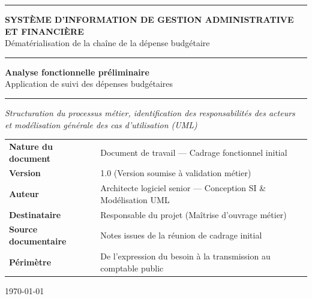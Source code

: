 \begin{titlepage}
\thispagestyle{empty}

\begin{center}
  {\color{BleuInstitutionnel}\rule{\linewidth}{2pt}}
  \vspace{0.3cm}

  {\large\sffamily\bfseries\textcolor{BleuInstitutionnel}{SYSTÈME D'INFORMATION DE GESTION ADMINISTRATIVE ET FINANCIÈRE}}\\[0.2cm]
  {\normalsize\sffamily\textcolor{GrisFonce}{Dématérialisation de la chaîne de la dépense budgétaire}}

  \vspace{0.3cm}
  {\color{BleuInstitutionnel}\rule{\linewidth}{0.8pt}}

  \vspace{3.2cm}

  {\fontsize{22}{28}\selectfont\sffamily\bfseries\textcolor{BleuInstitutionnel}{Analyse fonctionnelle préliminaire}}\\[0.5cm]
  {\fontsize{16}{22}\selectfont\sffamily\textcolor{BleuSecondaire}{Application de suivi des dépenses budgétaires}}

  \vspace{1.2cm}
  {\color{GrisBordure}\rule{0.45\linewidth}{1pt}}
  \vspace{1.2cm}

  {\normalsize\itshape\textcolor{GrisFonce}{%
    Structuration du processus métier, identification des responsabilités des acteurs\\
    et modélisation générale des cas d'utilisation (UML)%
  }}

  \vfill

  \begin{tabularx}{0.92\linewidth}{L{4.5cm} Y}
    \toprule
    \textbf{\sffamily\textcolor{BleuInstitutionnel}{Nature du document}} & Document de travail — Cadrage fonctionnel initial \\
    \textbf{\sffamily\textcolor{BleuInstitutionnel}{Version}} & 1.0 (Version soumise à validation métier) \\
    \textbf{\sffamily\textcolor{BleuInstitutionnel}{Auteur}} & Architecte logiciel senior — Conception SI \& Modélisation UML \\
    \textbf{\sffamily\textcolor{BleuInstitutionnel}{Destinataire}} & Responsable du projet (Maîtrise d'ouvrage métier) \\
    \textbf{\sffamily\textcolor{BleuInstitutionnel}{Source documentaire}} & Notes issues de la réunion de cadrage initial \\
    \textbf{\sffamily\textcolor{BleuInstitutionnel}{Périmètre}} & De l'expression du besoin à la transmission au comptable public \\
    \bottomrule
  \end{tabularx}

  \vspace{1.2cm}
  {\footnotesize\sffamily\textcolor{GrisFonce}{\today}}
\end{center}

\end{titlepage}
\newpage
